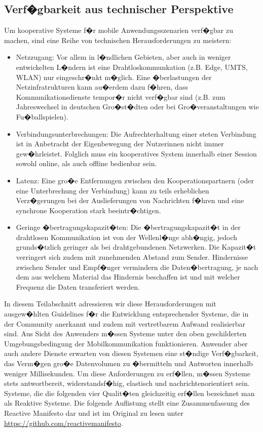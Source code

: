 \subsection{Verf�gbarkeit aus technischer Perspektive}
Um kooperative Systeme f�r mobile Anwendungsszenarien verf�gbar zu machen, sind eine Reihe von technischen Herausforderungen zu meistern:
\begin{itemize}
	\item Netzzugang: Vor allem in l�ndlichen Gebieten, aber auch in weniger entwickelten L�ndern ist eine Drahtloskommunkation (z.B. Edge, UMTS, WLAN) nur eingeschr�nkt m�glich. Eine �berlastungen der Netzinfratrukturen kann au�erdem dazu f�hren, dass Kommunikationsdienste tempor�r nicht verf�gbar sind (z.B. zum Jahreswechsel in deutschen Gro�st�dten oder bei Gro�veranstaltungen wie Fu�ballspielen).
	
	\item Verbindungsunterbrechungen: Die Aufrechterhaltung einer steten Verbindung ist in Anbetracht der Eigenbewegung der Nutzerinnen nicht immer gew�hrleistet. Folglich muss ein kooperatives System innerhalb einer Session sowohl online, als auch offline bedienbar sein.
	 
	\item Latenz: Eine gro�e Entfernungen zwischen den Kooperationspartnern (oder eine Unterbrechung der Verbindung) kann zu teils erheblichen Verz�gerungen bei der Auslieferungen von Nachrichten f�hren und eine synchrone Kooperation stark beeintr�chtigen. 

	\item Geringe �bertragungskapazit�ten: Die �bertragungskapazit�t in der drahtlosen Kommunikation ist von der Wellenl�nge abh�ngig, jedoch grunds�tzlich geringer als bei drahtgebundenen Netzwerken. Die Kapazit�t verringert sich zudem mit zunehmenden Abstand zum Sender. Hindernisse zwischen Sender und Empf�nger vermindern die Daten\-�ber\-tra\-gung, je nach dem aus welchem Material das Hindernis beschaffen ist und mit welcher Frequenz die Daten transferiert werden. 
\end{itemize} 

In diesem Teilabschnitt adressieren wir diese Herausforderungen mit ausgew�hlten Guidelines f�r die Entwicklung entsprechender Systeme, die in der Community anerkannt und zudem mit vertretbarem Aufwand realisierbar sind. Aus Sicht des Anwenders m�ssen Systeme unter den oben geschilderten Umgebungsbedingung der Mobilkommunikation funktionieren. Anwender aber auch andere Dienste erwarten  von diesen Systemen eine st�ndige Verf�gbarkeit, das Verm�gen gro�e Datenvolumen zu �bermitteln und Antworten innerhalb weniger Millisekunden. Um diese Anforderungen zu erf�llen, m�ssen Systeme stets antwortbereit, widerstandsf�hig, elastisch und nachrichtenorientiert sein. Systeme, die die folgenden vier Qualit�ten gleichzeitig erf�llen bezeichnet man als Reaktive Systeme. Die folgende Auflistung stellt eine Zusammenfassung des Reactive Manifesto dar und ist im Original zu lesen unter 
\url{https://github.com/reactivemanifesto}.


